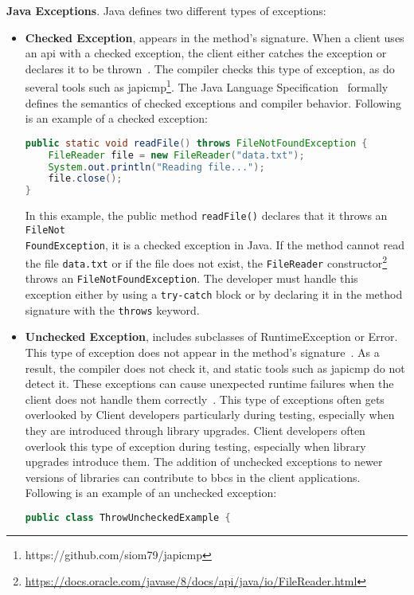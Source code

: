 \textbf{Java Exceptions}. Java defines two different types of exceptions:
\begin{itemize}
    \item \textbf{Checked Exception}, appears in the method's signature. When a client uses an
    \gls{api} with a checked exception, the client either catches the exception or declares it to be
    thrown~\cite{Sousa2020evolution}. The compiler checks this type of exception, as do several tools
    such as japicmp\footnote{https://github.com/siom79/japicmp}. The Java Language Specification~\cite{Gosling2021java}
    formally defines the semantics of checked exceptions and compiler behavior. Following is an example
    of a checked exception:
    \begin{lstlisting}[language=java]
public static void readFile() throws FileNotFoundException {
    FileReader file = new FileReader("data.txt");
    System.out.println("Reading file...");
    file.close();
}
    \end{lstlisting}
    In this example, the public method \texttt{readFile()} declares that it throws an \texttt{FileNot\\FoundException},
    it is a checked exception in Java. If the method cannot read the file \texttt{data.txt}
    or if the file does not exist, the \texttt{FileReader} constructor\footnote{\url{https://docs.oracle.com/javase/8/docs/api/java/io/FileReader.html}} throws an \texttt{FileNotFoundException}.
    The developer must handle this exception either by using a \texttt{try-catch} block or by declaring
    it in the method signature with the \texttt{throws} keyword.

    \item \textbf{Unchecked Exception}, includes subclasses of RuntimeException or Error. This type
    of exception does not appear in the method's signature~\cite{Asaduzzaman2017}. As a result, the
    compiler does not check it, and static tools such as japicmp do not detect it. These exceptions
    can cause unexpected runtime failures when the client does not handle them correctly~\cite{Padua2017}.
    This type of exceptions often gets overlooked by Client developers particularly during testing,
    especially when they are introduced through library upgrades. Client developers often overlook
    this type of exception during testing, especially when library upgrades introduce them. The
    addition of unchecked exceptions to newer versions of libraries can contribute to \gls{bbc}s in
    the client applications. Following is an example of an unchecked exception:
    \begin{lstlisting}[language=java]
public class ThrowUncheckedExample {


\end{lstlisting}
\end{itemize}
